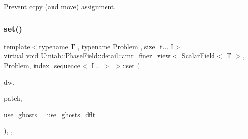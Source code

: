 Prevent copy (and move) assignment. 

\mbox{\label{classUintah_1_1PhaseField_1_1detail_1_1amr__finer__view_3_01ScalarField_3_01T_01_4_00_01Problem_810ae3f886a4d3bdb2b37c629369a2ec_acc717dc37c60169bc4c85fbaaea766b3}} 
\subsubsection{\texorpdfstring{set()}{set()}\hspace{0.1cm}{\footnotesize\ttfamily [1/2]}}
{\footnotesize\ttfamily template$<$typename T , typename Problem , size\+\_\+t... I$>$ \\
virtual void \hyperlink{classUintah_1_1PhaseField_1_1detail_1_1amr__finer__view}{Uintah\+::\+Phase\+Field\+::detail\+::amr\+\_\+finer\+\_\+view}$<$ \hyperlink{structUintah_1_1PhaseField_1_1ScalarField}{Scalar\+Field}$<$ T $>$, \hyperlink{classUintah_1_1PhaseField_1_1Problem}{Problem}, \hyperlink{namespaceUintah_1_1PhaseField_a237de804d99512e50613aff7c94a9461}{index\+\_\+sequence}$<$ I... $>$ $>$\+::set (\begin{DoxyParamCaption}\item[{Data\+Warehouse $\ast$}]{dw,  }\item[{const Patch $\ast$}]{patch,  }\item[{bool}]{use\+\_\+ghosts = {\ttfamily \hyperlink{classUintah_1_1PhaseField_1_1detail_1_1amr__finer__view_3_01ScalarField_3_01T_01_4_00_01Problem_810ae3f886a4d3bdb2b37c629369a2ec_aee5138b1c87ec5e7717b5f1dd6fd47cd}{use\+\_\+ghosts\+\_\+dflt}} }\end{DoxyParamCaption})\hspace{0.3cm}{\ttfamily [inline]}, {\ttfamily [override]}, {\ttfamily [virtual]}}



